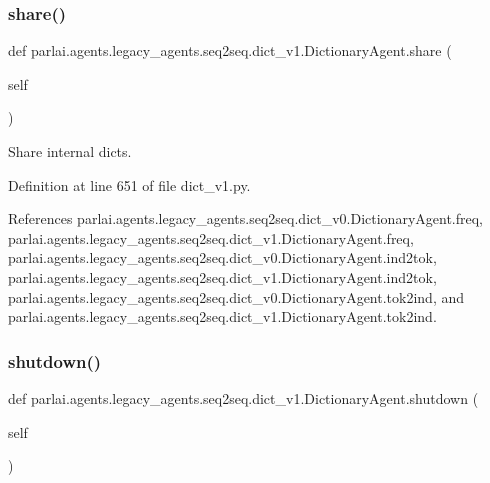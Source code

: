 \subsubsection{\texorpdfstring{share()}{share()}}
{\footnotesize\ttfamily def parlai.\+agents.\+legacy\+\_\+agents.\+seq2seq.\+dict\+\_\+v1.\+Dictionary\+Agent.\+share (\begin{DoxyParamCaption}\item[{}]{self }\end{DoxyParamCaption})}

\begin{DoxyVerb}Share internal dicts.\end{DoxyVerb}
 

Definition at line 651 of file dict\+\_\+v1.\+py.



References parlai.\+agents.\+legacy\+\_\+agents.\+seq2seq.\+dict\+\_\+v0.\+Dictionary\+Agent.\+freq, parlai.\+agents.\+legacy\+\_\+agents.\+seq2seq.\+dict\+\_\+v1.\+Dictionary\+Agent.\+freq, parlai.\+agents.\+legacy\+\_\+agents.\+seq2seq.\+dict\+\_\+v0.\+Dictionary\+Agent.\+ind2tok, parlai.\+agents.\+legacy\+\_\+agents.\+seq2seq.\+dict\+\_\+v1.\+Dictionary\+Agent.\+ind2tok, parlai.\+agents.\+legacy\+\_\+agents.\+seq2seq.\+dict\+\_\+v0.\+Dictionary\+Agent.\+tok2ind, and parlai.\+agents.\+legacy\+\_\+agents.\+seq2seq.\+dict\+\_\+v1.\+Dictionary\+Agent.\+tok2ind.

\mbox{\label{classparlai_1_1agents_1_1legacy__agents_1_1seq2seq_1_1dict__v1_1_1DictionaryAgent_a7758fcd79e9a391b4f4bd45e030fc59b}} 
\subsubsection{\texorpdfstring{shutdown()}{shutdown()}}
{\footnotesize\ttfamily def parlai.\+agents.\+legacy\+\_\+agents.\+seq2seq.\+dict\+\_\+v1.\+Dictionary\+Agent.\+shutdown (\begin{DoxyParamCaption}\item[{}]{self }\end{DoxyParamCaption})}


